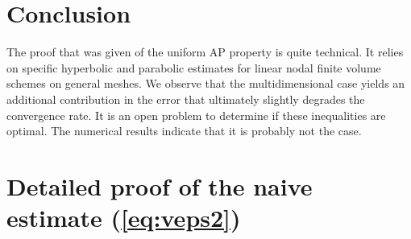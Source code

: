 \documentclass[a4paper,french,english,10pt]{article}
\begin{document}


\section{Conclusion}


The proof that was given of the uniform AP property is quite technical.
It relies on specific hyperbolic and parabolic estimates for linear
nodal finite volume schemes on general meshes.
We observe that the multidimensional case yields an additional contribution in the error
that ultimately slightly degrades the convergence rate.
It is an open problem to determine if these inequalities are optimal.
The numerical results indicate that it is probably not the case.


\appendix

\section{Detailed proof of the naive estimate (\ref{eq:veps2})}
\end{document}
